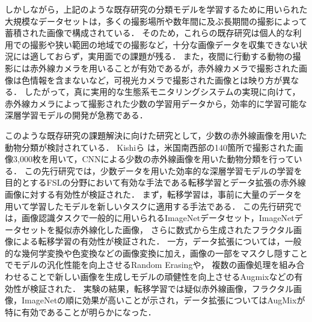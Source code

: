 しかしながら，上記のような既存研究の分類モデルを学習するために用いられた大規模なデータセットは，多くの撮影場所や数年間に及ぶ長期間の撮影によって蓄積された画像で構成されている．
そのため，これらの既存研究は個人的な利用での撮影や狭い範囲の地域での撮影など，十分な画像データを収集できない状況には適しておらず，実用面での課題が残る．
また，夜間に行動する動物の撮影には赤外線カメラを用いることが有効であるが，赤外線カメラで撮影された画像は色情報を含まないなど，可視光カメラで撮影された画像とは映り方が異なる．
したがって，真に実用的な生態系モニタリングシステムの実現に向けて，赤外線カメラによって撮影された少数の学習用データから，効率的に学習可能な深層学習モデルの開発が急務である．

このような既存研究の課題解決に向けた研究として，少数の赤外線画像を用いた動物分類が検討されている．
Kishiら \cite{kishimoto2023}は，米国南西部の140箇所で撮影された画像3,000枚を用いて，CNNによる少数の赤外線画像を用いた動物分類を行っている．
この先行研究では，少数データを用いた効率的な深層学習モデルの学習を目的とするFSLの分野において有効な手法である転移学習とデータ拡張の赤外線画像に対する有効性が検証された．
まず，転移学習は，事前に大量のデータを用いて学習したモデルを新しいタスクに適用する手法である．
この先行研究では，画像認識タスクで一般的に用いられるImageNetデータセット，ImageNetデータセットを擬似赤外線化した画像，
さらに数式から生成されたフラクタル画像による転移学習の有効性が検証された．
一方，データ拡張については，一般的な幾何学変換や色変換などの画像変換に加え，画像の一部をマスクし隠すことでモデルの汎化性能を向上させるRandom Erasingや，
複数の画像処理を組み合わせることで新しい画像を生成しモデルの頑健性を向上させるAugmixなどの有効性が検証された．
実験の結果，転移学習では疑似赤外線画像，フラクタル画像，ImageNetの順に効果が高いことが示され，データ拡張についてはAugMixが特に有効であることが明らかになった．

